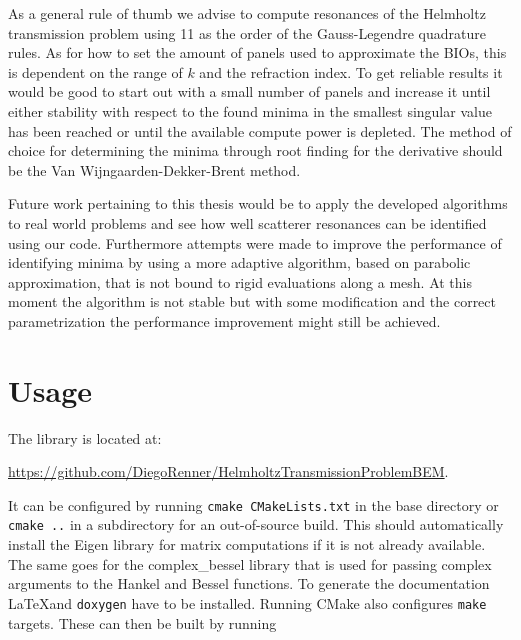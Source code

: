 \documentclass[a4paper, oneside]{discothesis}
\begin{document}
As a general rule of thumb we advise to compute resonances of the Helmholtz transmission problem using 11 as the order of the Gauss-Legendre quadrature rules.
As for how to set the amount of panels used to approximate the BIOs, this is dependent on the range of $k$ and the refraction index.
To get reliable results it would be good to start out with a small number of panels and increase it until either stability with respect to the found minima in the smallest singular value has been reached or until the available compute power is depleted.
The method of choice for determining the minima through root finding for the derivative should be the Van Wijngaarden-Dekker-Brent method. 

Future work pertaining to this thesis would be to apply the developed algorithms to real world problems and see how well scatterer resonances can be identified using our code.
Furthermore attempts were made to improve the performance of identifying minima by using a more adaptive algorithm, based on parabolic approximation, that is not bound to rigid evaluations along a mesh.
At this moment the algorithm is not stable but with some modification and the correct parametrization the performance improvement might still be achieved.




\appendix
\chapter{Usage} \label{chap:usage}
The library is located at:

\url{https://github.com/DiegoRenner/HelmholtzTransmissionProblemBEM}.

It can be configured by running \verb|cmake CMakeLists.txt| in the base directory
or \verb|cmake ..| in a subdirectory for an out-of-source build.
This should automatically install the Eigen library \cite{eigenweb} for matrix computations if it is not already available.
The same goes for the complex\_bessel library \cite{cb} that is used for passing complex arguments to the Hankel and Bessel functions.
To generate the documentation \LaTeX and \verb|doxygen| have to be installed.
Running CMake also configures \verb|make| targets.
These can then be built by running 
\end{document}

